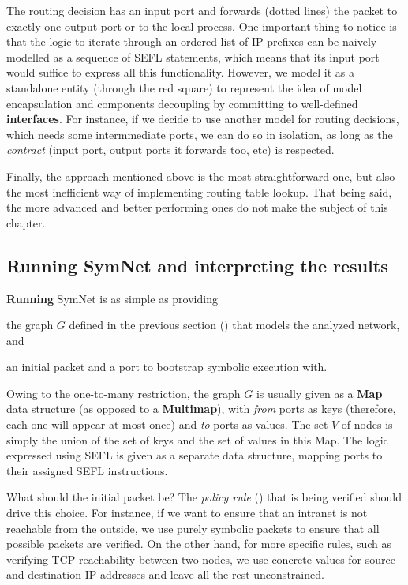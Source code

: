 The routing decision has an input port and forwards (dotted lines) the packet
to exactly one output port or to the local process.  One important thing to
notice is that the logic to iterate through an ordered list of IP prefixes can
be naively modelled as a sequence of  SEFL statements,
which means that its input port would suffice to express all this
functionality.  However, we model it as a standalone entity (through the red
square) to represent the idea of model encapsulation and components decoupling
by committing to well-defined \textbf{interfaces}.  For instance, if we decide
to use another model for routing decisions, which needs some intermmediate
ports, we can do so in isolation, as long as the \emph{contract} (input port,
output ports it forwards too, etc) is respected.

Finally, the  approach mentioned above is the most
straightforward one, but also the most inefficient way of implementing routing
table lookup. That being said, the more advanced and better performing ones do
not make the subject of this chapter.

\subsection{Running SymNet and interpreting the results}

\textbf{Running} SymNet is as simple as providing
\begin{enumerate*}[a)]
  \item the graph $G$ defined in the previous section
    () that models the analyzed
    network, and
  \item an initial packet and a port to bootstrap symbolic execution with.
\end{enumerate*}

Owing to the one-to-many restriction, the graph $G$ is usually given as a
\textbf{Map} data structure (as opposed to a \textbf{Multimap}), with
\emph{from} ports as keys (therefore, each one will appear at most once) and
\emph{to} ports as values.  The set $V$ of nodes is simply the union of the set
of keys and the set of values in this Map.  The logic expressed using SEFL is
given as a separate data structure, mapping ports to their assigned SEFL
instructions.

What should the initial packet be?  The \emph{policy rule}
() that is being verified
should drive this choice.  For instance, if we want to ensure that an intranet
is not reachable from the outside, we use purely symbolic packets to ensure
that all possible packets are verified.  On the other hand, for more specific
rules, such as verifying TCP reachability between two nodes, we use concrete
values for source and destination IP addresses and leave all the rest
unconstrained.

